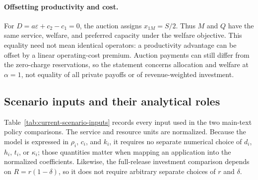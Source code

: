 \paragraph{Offsetting productivity and cost.}
For $D=a\varepsilon+c_2-c_1=0$, the auction assigns $x_{1M}=S/2$. Thus $M$ and $Q$ have the same service, welfare, and preferred capacity under the welfare objective. This equality need not mean identical operators: a productivity advantage can be offset by a linear operating-cost premium. Auction payments can still differ from the zero-charge reservations, so the statement concerns allocation and welfare at $\alpha=1$, not equality of all private payoffs or of revenue-weighted investment.

\subsection{Scenario inputs and their analytical roles}

Table~\ref{tab:current-scenario-inputs} records every input used in the two main-text policy comparisons. The service and resource units are normalized. Because the model is expressed in $\rho_i$, $c_i$, and $k_i$, it requires no separate numerical choice of $d_i$, $h_i$, $t_i$, or $\kappa_i$; those quantities matter when mapping an application into the normalized coefficients. Likewise, the full-release investment comparison depends on $R=r(1-\delta)$, so it does not require arbitrary separate choices of $r$ and $\delta$.

